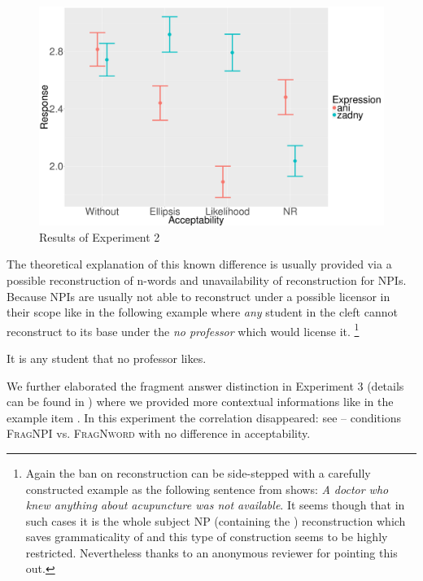 \documentclass[output=paper, colorlinks, citecolor=brown, newtxmath]{langsci/langscibook}
\begin{document}
\begin{figure}
\centering
\includegraphics[scale=0.25]{figures/mean-sum.pdf}
\caption{Results of Experiment 2}\label{fig:exp2}
\end{figure}

\noindent The theoretical explanation of this known difference is usually provided via a possible reconstruction of n-words and unavailability of reconstruction for NPIs. Because NPIs are usually not able to reconstruct under a possible licensor in their scope \citep{de1998licensing} like in the following example where  \textit{any} student in the cleft cannot reconstruct to its base  under the  \textit{no professor} which would license it.%
\footnote{Again the ban on  reconstruction can be side-stepped with a carefully constructed example as the following sentence from \cite[p.17]{uribe1994interface} shows: \textit{A doctor who knew anything about acupuncture was not available}. It seems though that in such cases it is the whole subject NP (containing the ) reconstruction which saves grammaticality of  and this type of construction seems to be highly restricted. Nevertheless thanks to an anonymous reviewer for pointing this out.}

\ea *It is any student that no professor likes.
\z

\noindent We further elaborated the fragment answer distinction in Experiment 3 (details can be found in \citealt{docekaldotlacilsubber}) where we provided more contextual informations like in the example item . In this experiment the correlation disappeared: see  -- conditions \textsc{FragNPI} vs. \textsc{FragNword} with no difference in acceptability.
\end{document}
